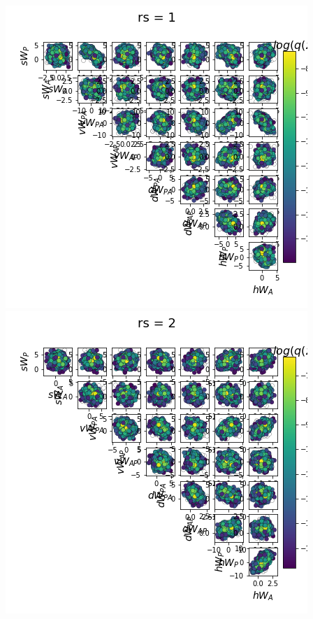 \documentclass[11pt]{article}
\begin{document}
\begin{center}
\includegraphics[scale=0.33]{figs/Z_SC_full_c=0_p=80_rs=1.png}
\includegraphics[scale=0.33]{figs/Z_SC_full_c=0_p=80_rs=2.png}

\end{center}
\end{document}
